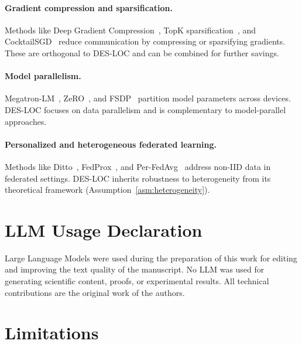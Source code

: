\paragraph{Gradient compression and sparsification.}
Methods like Deep Gradient Compression~\citep{lin2018deep}, TopK sparsification~\citep{alistarh2018convergence}, and CocktailSGD~\citep{wang2023cocktailsgd} reduce communication by compressing or sparsifying gradients. These are orthogonal to DES-LOC and can be combined for further savings.

\paragraph{Model parallelism.}
Megatron-LM~\citep{shoeybi2019megatron}, ZeRO~\citep{rajbhandari2020zero}, and FSDP~\citep{zhao2023pytorch} partition model parameters across devices. DES-LOC focuses on data parallelism and is complementary to model-parallel approaches.

\paragraph{Personalized and heterogeneous federated learning.}
Methods like Ditto~\citep{li2021ditto}, FedProx~\citep{li2020federated}, and Per-FedAvg~\citep{fallah2020personalized} address non-IID data in federated settings. DES-LOC inherits robustness to heterogeneity from its theoretical framework (Assumption~\ref{asm:heterogeneity}).

\section{LLM Usage Declaration}
\label{sec:llm_usage}

Large Language Models were used during the preparation of this work for editing and improving the
text quality of the manuscript. No LLM was used for generating scientific content, proofs, or
experimental results. All technical contributions are the original work of the authors.

\section{Limitations}
\label{sec:limitations}

